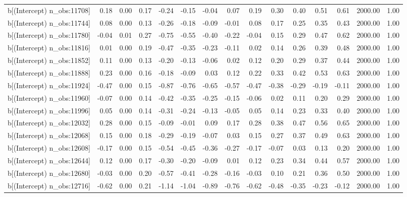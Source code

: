 \begin{table}[ht]
\begin{tabular}{rrrrrrrrrrrrrrr}
  b[(Intercept) n\_obs:11708] & 0.18 & 0.00 & 0.17 & -0.24 & -0.15 & -0.04 & 0.07 & 0.19 & 0.30 & 0.40 & 0.51 & 0.61 & 2000.00 & 1.00 \\ 
  b[(Intercept) n\_obs:11744] & 0.08 & 0.00 & 0.13 & -0.26 & -0.18 & -0.09 & -0.01 & 0.08 & 0.17 & 0.25 & 0.35 & 0.43 & 2000.00 & 1.00 \\ 
  b[(Intercept) n\_obs:11780] & -0.04 & 0.01 & 0.27 & -0.75 & -0.55 & -0.40 & -0.22 & -0.04 & 0.15 & 0.29 & 0.47 & 0.62 & 2000.00 & 1.00 \\ 
  b[(Intercept) n\_obs:11816] & 0.01 & 0.00 & 0.19 & -0.47 & -0.35 & -0.23 & -0.11 & 0.02 & 0.14 & 0.26 & 0.39 & 0.48 & 2000.00 & 1.00 \\ 
  b[(Intercept) n\_obs:11852] & 0.11 & 0.00 & 0.13 & -0.20 & -0.13 & -0.06 & 0.02 & 0.12 & 0.20 & 0.29 & 0.37 & 0.44 & 2000.00 & 1.00 \\ 
  b[(Intercept) n\_obs:11888] & 0.23 & 0.00 & 0.16 & -0.18 & -0.09 & 0.03 & 0.12 & 0.22 & 0.33 & 0.42 & 0.53 & 0.63 & 2000.00 & 1.00 \\ 
  b[(Intercept) n\_obs:11924] & -0.47 & 0.00 & 0.15 & -0.87 & -0.76 & -0.65 & -0.57 & -0.47 & -0.38 & -0.29 & -0.19 & -0.11 & 2000.00 & 1.00 \\ 
  b[(Intercept) n\_obs:11960] & -0.07 & 0.00 & 0.14 & -0.42 & -0.35 & -0.25 & -0.15 & -0.06 & 0.02 & 0.11 & 0.20 & 0.29 & 2000.00 & 1.00 \\ 
  b[(Intercept) n\_obs:11996] & 0.05 & 0.00 & 0.14 & -0.31 & -0.24 & -0.13 & -0.05 & 0.05 & 0.14 & 0.23 & 0.33 & 0.40 & 2000.00 & 1.00 \\ 
  b[(Intercept) n\_obs:12032] & 0.28 & 0.00 & 0.15 & -0.09 & -0.01 & 0.09 & 0.17 & 0.28 & 0.38 & 0.47 & 0.56 & 0.65 & 2000.00 & 1.00 \\ 
  b[(Intercept) n\_obs:12068] & 0.15 & 0.00 & 0.18 & -0.29 & -0.19 & -0.07 & 0.03 & 0.15 & 0.27 & 0.37 & 0.49 & 0.63 & 2000.00 & 1.00 \\ 
  b[(Intercept) n\_obs:12608] & -0.17 & 0.00 & 0.15 & -0.54 & -0.45 & -0.36 & -0.27 & -0.17 & -0.07 & 0.03 & 0.13 & 0.20 & 2000.00 & 1.00 \\ 
  b[(Intercept) n\_obs:12644] & 0.12 & 0.00 & 0.17 & -0.30 & -0.20 & -0.09 & 0.01 & 0.12 & 0.23 & 0.34 & 0.44 & 0.57 & 2000.00 & 1.00 \\ 
  b[(Intercept) n\_obs:12680] & -0.03 & 0.00 & 0.20 & -0.57 & -0.41 & -0.28 & -0.16 & -0.03 & 0.10 & 0.21 & 0.36 & 0.50 & 2000.00 & 1.00 \\ 
  b[(Intercept) n\_obs:12716] & -0.62 & 0.00 & 0.21 & -1.14 & -1.04 & -0.89 & -0.76 & -0.62 & -0.48 & -0.35 & -0.23 & -0.12 & 2000.00 & 1.00 \\ 

\end{tabular}
\end{table}
